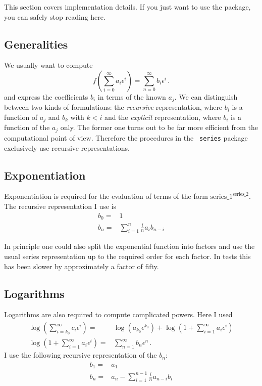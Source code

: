\documentclass[titlepage]{article}
\begin{document}
This section covers implementation details. If you just want to use the
package, you can safely stop reading here.

\subsection{Generalities}
\label{sec:impl_general}


 We usually want to compute
\begin{equation}
  \label{eq:def}
  f\left(\sum_{i=0}^{\infty}a_i \epsilon^i\right)=\sum_{n=0}^\infty b_i \epsilon^i\,.
\end{equation}
and express the coefficients $b_i$ in terms of the known $a_j$. We can
distinguish between two kinds of formulations: the {\it recursive} representation,
where $b_i$ is a function of $a_j$ and $b_k$ with $k < i$ and the {\it
  explicit} representation, where $b_i$ is a function of the $a_j$ only.
The former one turns out to be far more efficient from the
computational point of view. Therefore the procedures in the {\tt
  series} package exclusively use recursive representations.

\subsection{Exponentiation}
\label{sec:impl_exp}

Exponentiation is required for the evaluation of terms of the form
$\text{series\_1}^{\text{series\_2}}$.
The recursive representation I use is
\begin{align}
  \label{eq:exp_rec}
b_0=&1\\
b_n =&  \sum_{i=1}^{n} \frac{i}{n} a_{i}b_{n-i}
\end{align}

In principle one could also split the exponential function into factors
and use the usual series representation up to the required order for
each factor. In tests this has been slower by approximately a factor of fifty.

\subsection{Logarithms}
\label{sec:impl_log}

Logarithms are also required to compute complicated powers. Here I used
\begin{align}
  \label{eq:log}
\log\left(\sum_{i=k_0}^{\infty}c_i \epsilon^i\right)=&\log\left(a_{k_0}\epsilon^{k_0}\right)+\log\left(1+\sum_{i=1}^{\infty}a_i \epsilon^i\right)\\
\log\left(1+\sum_{i=1}^{\infty}a_i \epsilon^i\right)=&\sum_{n=1}^\infty
b_n\epsilon^n\,.
\end{align}
I use the following recursive representation of the $b_n$:
\begin{align}
  \label{eq:log_rec}
b_1=&a_1\\
b_n =& a_n - \sum_{i=1}^{n-1} \frac{i}{n} a_{n-i}b_{i}
\end{align}
\end{document}
